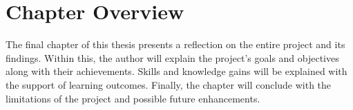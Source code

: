 \section{Chapter Overview}

The final chapter of this thesis presents a reflection on the entire project and its findings. Within this, the author will explain the project's goals and objectives along with their achievements. Skills and knowledge gains will be explained with the support of learning outcomes. Finally, the chapter will conclude with the limitations of the project and possible future enhancements.